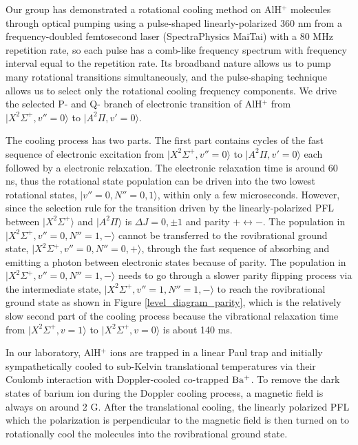 \documentclass[aip,jcp,reprint]{revtex4-1}
\begin{document}
Our group has demonstrated a rotational cooling method on AlH$^+$ molecules through optical pumping using a pulse-shaped linearly-polarized 360 nm from a frequency-doubled femtosecond laser (SpectraPhysics MaiTai) with a 80 MHz repetition rate, so each pulse has a comb-like frequency spectrum with frequency interval equal to the repetition rate. Its broadband nature allows us to pump many rotational transitions simultaneously, and the pulse-shaping technique allows us to select only the rotational cooling frequency components. We drive the selected P- and Q- branch of electronic transition of AlH$^+$ from $\lvert X^2\Sigma^+, v''=0\rangle$ to $\lvert A^{2}\Pi, v'=0\rangle$.\par
The cooling process has two parts. The first part contains cycles of the fast sequence of electronic excitation from $\lvert X^2\Sigma^+, v''=0\rangle$ to $\lvert A^{2}\Pi, v'=0\rangle$ each followed by a electronic relaxation. The electronic relaxation time is around 60 ns, thus the rotational state population can be driven into the two lowest rotational states, $\lvert v''=0, N''=0,1\rangle$, within only a few microseconds. However, since the selection rule for the transition driven by the linearly-polarized PFL between $\lvert X^2\Sigma^+\rangle$  and $\lvert A^2\Pi\rangle$ is $\Delta J=0, \pm 1$ and parity $+\longleftrightarrow -$. The population in $\lvert X^2\Sigma^+, v''=0, N''=1, -\rangle$ cannot be transferred to the rovibrational ground state, $\lvert X^2\Sigma^+, v''=0, N''=0, +\rangle$, through the fast sequence of absorbing and emitting a photon between electronic states because of parity. The population in $\lvert X^2\Sigma^+, v''=0, N''=1, -\rangle$ needs to go through a slower parity flipping process via the intermediate state, $\lvert X^2\Sigma^+, v''=1, N''=1, -\rangle$ to reach the rovibrational ground state as shown in Figure \ref{level_diagram_parity}, which is the relatively slow second part of the cooling process because the vibrational relaxation time from $\lvert X^2\Sigma^+, v=1\rangle$ to $\lvert X^2\Sigma^+, v=0\rangle$ is about 140 ms.

In our laboratory, AlH$^+$ ions are trapped in a linear Paul trap and initially sympathetically cooled to sub-Kelvin translational temperatures via their Coulomb interaction with Doppler-cooled co-trapped $\rm Ba^+$. To remove the dark states of barium ion during the Doppler cooling process, a magnetic field is always on around 2 G. After the translational cooling, the linearly polarized PFL which the polarization is perpendicular to the magnetic field is then turned on to rotationally cool the molecules into the rovibrational ground state.
\end{document}
